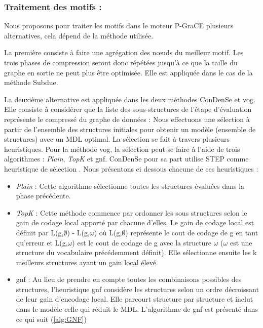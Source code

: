 \documentclass[a4paper,oneside,12pt]{report}
\theoremstyle{definition}
\begin{document}
		   
		\subsubsection{Traitement des motifs :}
		
		Nous proposons pour traiter les motifs dans le moteur P-GraCE plusieurs alternatives, cela dépend de la méthode utilisée.
		
La première consiste à faire une agrégation des nœuds du meilleur motif. Les trois phases de compression seront donc répétées jusqu'à ce que la taille du graphe en sortie ne peut plus être optimisée. Elle est appliquée dans le cas de la méthode Subdue.

 La deuxième alternative est appliquée dans les deux méthodes \gls{ConDenSe} et \gls{vog}. Elle consiste à considérer que  la liste des sous-structures de l'étape d'évaluation représente le compressé du graphe de données : Nous effectuons une sélection à partir de l'ensemble des structures initiales pour obtenir un modèle (ensemble de structures) avec un MDL optimal. La sélection se fait à travers plusieurs heuristiques. Pour la méthode \gls{vog}, la sélection peut se faire à l'aide de trois algorithmes : \textit{Plain}, \textit{TopK} et  \gls{gnf}. \gls{ConDenSe} pour sa part utilise STEP comme heuristique de sélection . Nous présentons ci dessous chacune de ces heuristiques :
\begin{itemize}
\item \textit{Plain} : Cette algorithme sélectionne toutes les structures évaluées dans la phase précédente. 
\item \textit{TopK} : Cette méthode commence par ordonner les sous structures selon le gain de codage local apporté par chacune d'elles. Le gain de codage local est définit par L(g,$\emptyset$) - L(g,$\omega$) où  L(g,$\emptyset$) représente le cout de codage de g en tant qu'erreur et L(g,$\omega$) est le cout de codage de g avec la structure $\omega$ ($\omega$ est une structure du vocabulaire précédemment définit). Elle sélectionne ensuite les k meilleurs structures ayant un gain local élevé.
\item \gls{gnf} : Au lieu de prendre en compte toutes les combinaisons possibles des structures, l'heuristique 
\gls{gnf}
 considère les structures selon un ordre décroissant de leur gain d'encodage local. Elle parcourt structure par structure et inclut dans le modèle celle qui réduit le MDL. L'algorithme de \gls{gnf} est présenté dans ce qui suit (\ref{alg:GNF})   

\end{itemize}
\end{document}
